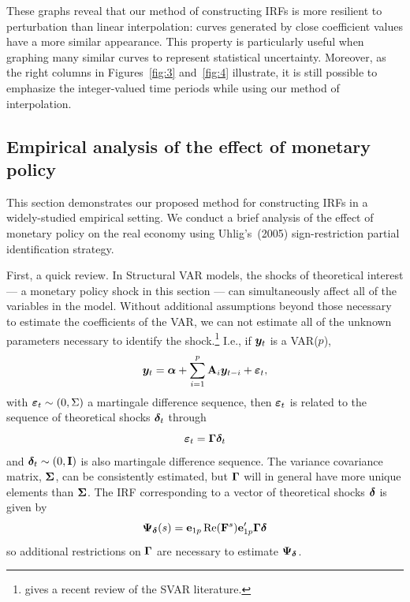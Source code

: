 \documentclass[AER,reviewmode]{tex/AEA}
\begin{document}
These graphs reveal that our method of constructing IRFs is more
resilient to perturbation than linear interpolation: curves generated
by close coefficient values have a more similar appearance. This
property is particularly useful when graphing many similar curves to
represent statistical uncertainty. Moreover, as the right columns in
Figures~\ref{fig:3} and~\ref{fig:4} illustrate, it is still possible
to emphasize the integer-valued time periods while using our method of
interpolation.

\subsection{Empirical analysis of the effect of monetary policy}
\label{S3.2}

\noindent%
This section demonstrates our proposed method for constructing IRFs
in a widely-studied empirical setting. We conduct a brief analysis of
the effect of monetary policy on the real economy using Uhlig's~(2005)
sign-restriction partial identification strategy.

First, a quick review. In Structural VAR models, the shocks of
theoretical interest --- a monetary policy shock in this section ---
can simultaneously affect all of the variables in the model. Without
additional assumptions beyond those necessary to estimate the
coefficients of the VAR, we can not estimate all of the unknown
parameters necessary to identify the shock.\footnote{%
  \citet{Kil:13} gives a recent review of the SVAR literature.} %
I.e., if $\bm{y}_t$ is a VAR($p$),
\begin{equation}
  \label{eq:13}
  \bm{y}_t = \bm{\alpha} + \sum_{i=1}^p \mathbf{A}_i \bm{y}_{t-i} + \bm{\varepsilon}_t,
\end{equation}
with $\bm{\varepsilon}_t \sim (0, \Sigma)$ a martingale difference sequence, then
$\bm{\varepsilon}_t$ is related to the sequence of theoretical shocks $\bm{\delta}_t$
through
\begin{equation*}
  \bm{\varepsilon}_t = \bm{\Gamma} \bm{\delta}_t
\end{equation*}
and $\bm{\delta}_t \sim (0, \mathbf{I})$ is also martingale difference sequence. The
variance covariance matrix, $\bm{\Sigma}$, can be consistently estimated,
but $\bm{\Gamma}$ will in general have more unique elements than $\bm{\Sigma}$.
The IRF corresponding to a vector of theoretical shocks $\bm{\delta}$ is
given by
\begin{equation}
  \label{eq:14}
  \bm{\Psi}_{\bm{\delta}}(s) = \mathbf{e}_{1p} \operatorname{Re}(\mathbf{F}^s) \mathbf{e}_{1p}' \bm{\Gamma} \bm{\delta}
\end{equation}
so additional restrictions on $\bm{\Gamma}$ are necessary to estimate
$\bm{\Psi}_{\bm{\delta}}$.
\end{document}
